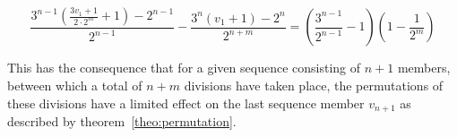 \documentclass[12pt]{amsart}
\theoremstyle{definition}
\begin{document}
\[
\frac{3^{n-1}\left(\frac{3v_1+1}{2\cdot2^m}+1\right)-2^{n-1}}{2^{n-1}}-\frac{3^n\left(v_1+1\right)-2^n}{2^{n+m}}=\left(\frac{3^{n-1}}{2^{n-1}}-1\right)\left(1-\frac{1}{2^m}\right)
\]

\par\bigskip
This has the consequence that for a given sequence consisting of $n+1$ members, between which a total of $n+m$ divisions have taken place, the permutations of these divisions have a limited effect on the last sequence member $v_{n+1}$ as described by theorem~\ref{theo:permutation}.

\vspace{1em}


\end{document}
